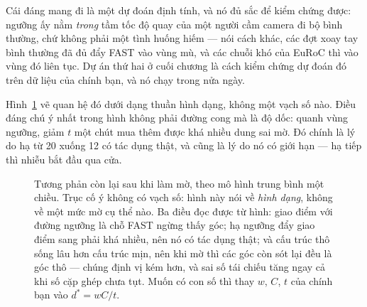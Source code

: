 \documentclass[../../deep_learning.tex]{subfiles}
\begin{document}
Cái đáng mang đi là một dự đoán định tính, và nó đủ sắc để kiểm chứng được: ngưỡng ấy nằm \emph{trong} tầm tốc độ quay của một người cầm camera đi bộ bình thường, chứ không phải một tình huống hiếm --- nói cách khác, các đợt xoay tay bình thường đã đủ đẩy FAST vào vùng mù, và các chuỗi khó của EuRoC thì vào vùng đó liên tục. Dự án thứ hai ở cuối chương là cách kiểm chứng dự đoán đó trên dữ liệu của chính bạn, và nó chạy trong nửa ngày.

Hình~\ref{fig:f28-mo-fast} vẽ quan hệ đó dưới dạng thuần hình dạng, không một vạch số nào. Điều đáng chú ý nhất trong hình không phải đường cong mà là độ dốc: quanh vùng ngưỡng, giảm \(t\) một chút mua thêm được khá nhiều dung sai mờ. Đó chính là lý do hạ  từ 20 xuống 12 có tác dụng thật, và cũng là lý do nó có giới hạn --- hạ tiếp thì nhiễu bắt đầu qua cửa.

\begin{figure}[H]\centering
{}
\caption{Tương phản còn lại sau khi làm mờ, theo mô hình trung bình một chiều. Trục cố ý không có vạch số: hình này nói về \emph{hình dạng}, không về một mức mờ cụ thể nào. Ba điều đọc được từ hình: giao điểm với đường ngưỡng là chỗ FAST ngừng thấy góc; hạ ngưỡng đẩy giao điểm sang phải khá nhiều, nên nó có tác dụng thật; và cấu trúc thô sống lâu hơn cấu trúc mịn, nên khi mờ thì các góc còn sót lại đều là góc thô --- chúng định vị kém hơn, và sai số tái chiếu tăng ngay cả khi số cặp ghép chưa tụt. Muốn có con số thì thay \(w\), \(C\), \(t\) của chính bạn vào \(d^{*}=wC/t\).}
\label{fig:f28-mo-fast}
\end{figure}
\end{document}
